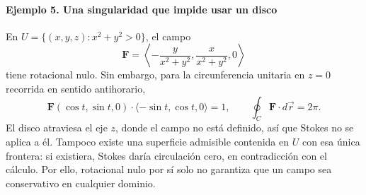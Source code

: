 \paragraph{Ejemplo 5. Una singularidad que impide usar un disco}
En $U=\{(x,y,z):x^2+y^2>0\}$, el campo
\[
\mathbf F=\left\langle-\frac{y}{x^2+y^2},\frac{x}{x^2+y^2},0\right\rangle
\]
tiene rotacional nulo. Sin embargo, para la circunferencia unitaria en $z=0$ recorrida en sentido antihorario,
\[
\mathbf F(\cos t,\sin t,0)\cdot\langle-\sin t,\cos t,0\rangle=1,
\qquad \oint_C\mathbf F\cdot d\vec r=2\pi.
\]
El disco atraviesa el eje $z$, donde el campo no está definido, así que Stokes no se aplica a él. Tampoco existe una superficie admisible contenida en $U$ con esa única frontera: si existiera, Stokes daría circulación cero, en contradicción con el cálculo. Por ello, rotacional nulo por sí solo no garantiza que un campo sea conservativo en cualquier dominio.


\begin{center}
\begin{minipage}{.94\textwidth}
\centering
\begingroup\shorthandoff{>}
\endgroup
\end{minipage}
\end{center}

